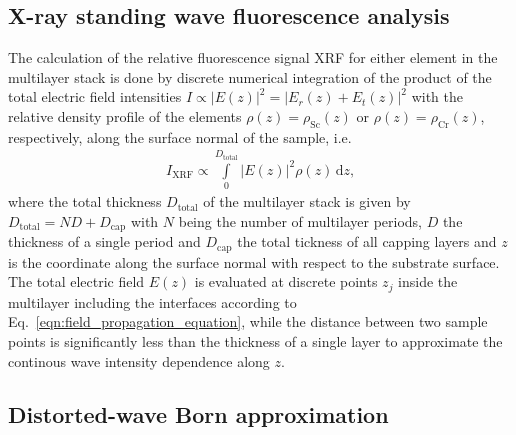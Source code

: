 \subsection{X-ray standing wave fluorescence analysis} \label{subsec:xrf_formalism}

The calculation of the relative fluorescence signal XRF for either element in the multilayer stack is done by discrete numerical integration of the product of the total electric field intensities $I \propto |E(z)|^2 = | E_r(z) + E_t(z)|^2$ with the relative density profile of the elements $\rho(z) = \rho_\text{Sc}(z)$ or $\rho(z) = \rho_\text{Cr}(z)$, respectively, along the surface normal of the sample, i.e.~
\begin{align}
 I_\text{XRF}\propto \int\limits_0^{D_\text{total}} |E(z)|^2 \rho(z) \,\text{d}z \text{,}
\end{align}
where the total thickness $D_\text{total}$ of the multilayer stack is given by $D_\text{total} = N D+D_\text{cap}$ with $N$ being the number of multilayer periods, $D$ the thickness of a single period and $D_\text{cap}$ the total tickness of all capping layers and $z$ is the coordinate along the surface normal with respect to the substrate surface. The total electric field $E(z)$ is evaluated at discrete points $z_j$ inside the multilayer including the interfaces according to Eq.~\eqref{eqn:field_propagation_equation}, while the distance between two sample points is significantly less than the thickness of a single layer to approximate the continous wave intensity dependence along $z$.
\subsection{Distorted-wave Born approximation} \label{subsec:dwba_formalism}

